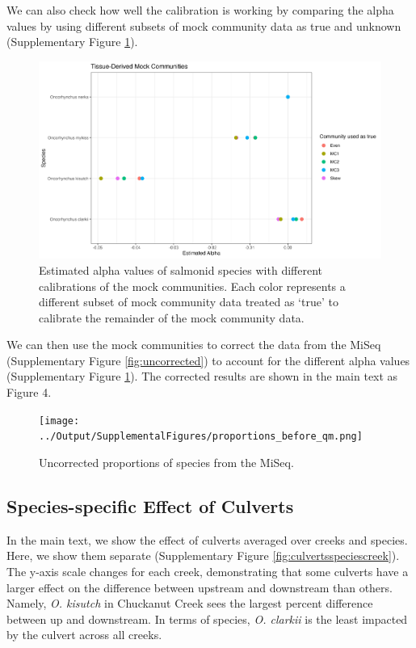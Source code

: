 \documentclass[
]{article}
\begin{document}
We can also check how well the calibration is working by comparing the
alpha values by using different subsets of mock community data as true
and unknown (Supplementary Figure \ref{fig:alphas}).

\begin{figure}
\centering
\includegraphics{../Output/SupplementalFigures/mock_internal_calibration_compare_alphas.png}
\caption{Estimated alpha values of salmonid species with different
calibrations of the mock communities. Each color represents a different
subset of mock community data treated as `true' to calibrate the
remainder of the mock community data.\label{fig:alphas}}
\end{figure}

We can then use the mock communities to correct the data from the MiSeq
(Supplementary Figure \ref{fig:uncorrected}) to account for the
different alpha values (Supplementary Figure \ref{fig:alphas}). The
corrected results are shown in the main text as Figure 4.

\begin{figure}
\centering
\texttt{[image: ../Output/SupplementalFigures/proportions\_before\_qm.png]}
\caption{Uncorrected proportions of species from the MiSeq.}
\end{figure}

\hypertarget{species-specific-effect-of-culverts}{%
\subsection{Species-specific Effect of
Culverts}\label{species-specific-effect-of-culverts}}

In the main text, we show the effect of culverts averaged over creeks
and species. Here, we show them separate (Supplementary Figure
\ref{fig:culvertsspeciescreek}). The y-axis scale changes for each
creek, demonstrating that some culverts have a larger effect on the
difference between upstream and downstream than others. Namely, \emph{O.
kisutch} in Chuckanut Creek sees the largest percent difference between
up and downstream. In terms of species, \emph{O. clarkii} is the least
impacted by the culvert across all creeks.
\end{document}
